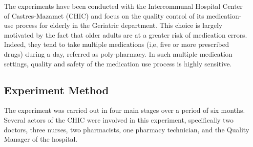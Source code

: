 \documentclass[preprint,3p,times,number]{elsarticle}
\begin{document}
The experiments have been conducted with the Intercommunal Hospital Center of Castres-Mazamet (CHIC) and focus on the quality control of its medication-use process for elderly in the Geriatric department. This choice is largely motivated by the fact that older adults are at a greater risk of medication errors. Indeed, they tend to take multiple medications (i,e, five or more prescribed drugs) during a day, referred as poly-pharmacy. In such multiple medication settings, quality and safety of the medication use process is highly sensitive.

\subsection{Experiment Method}
\label{sec:experiment:method}
The experiment was carried out in four main stages over a period of six months. Several actors of the CHIC were involved in this experiment, specifically two doctors, three nurses, two pharmacists, one pharmacy technician, and the Quality Manager of the hospital. 
\end{document}
